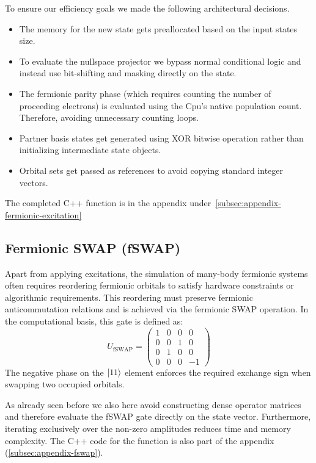To ensure our efficiency goals we made the following architectural decisions.
\begin{itemize}
    \item The memory for the new state gets preallocated based on the input states size.
    \item To evaluate the nullspace projector we bypass normal conditional logic and instead use bit-shifting and masking directly on the state.
    \item The fermionic parity phase (which requires counting the number of proceeding electrons) is evaluated using the Cpu's native population count.
    Therefore, avoiding unnecessary counting loops.
    \item Partner basis states get generated using XOR bitwise operation rather than initializing intermediate state objects.
    \item Orbital sets get passed as references to avoid copying standard integer vectors.
\end{itemize}

The completed C++ function is in the appendix under~\ref{subsec:appendix-fermionic-excitation}
\subsection{Fermionic SWAP (fSWAP)}
Apart from applying excitations, the simulation of many-body fermionic systems often requires reordering fermionic orbitals to satisfy hardware constraints or algorithmic requirements.
This reordering must preserve fermionic anticommutation relations and is achieved via the fermionic SWAP operation.
In the computational basis, this gate is defined as:
\begin{equation}
	U_{\text{fSWAP}} = \begin{pmatrix}
						   1 & 0 & 0 & 0 \\
						   0 & 0 & 1 & 0 \\
						   0 & 1 & 0 & 0 \\
						   0 & 0 & 0 & -1
	\end{pmatrix}
\end{equation}
The negative phase on the $\ket{11}$ element enforces the required exchange sign when swapping two occupied orbitals.
\cite[chapter II.]{Verstraete2009quantum}


As already seen before we also here avoid constructing dense operator matrices and therefore evaluate the fSWAP gate directly on the state vector.
Furthermore, iterating exclusively over the non-zero amplitudes reduces time and memory complexity.
The C++ code for the function is also part of the appendix (\ref{subsec:appendix-fswap}).


